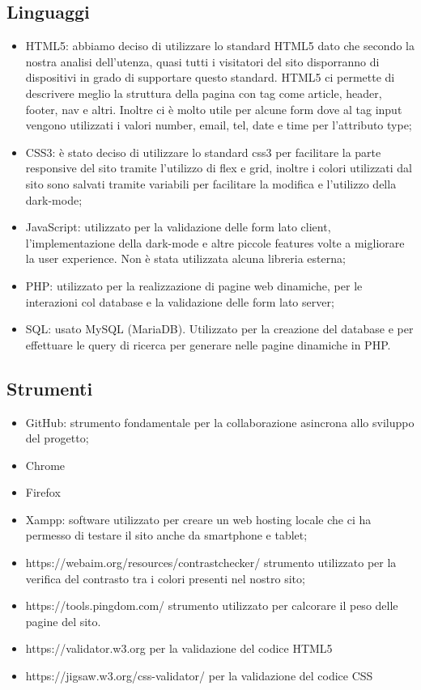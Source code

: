 \documentclass[a4paper]{article}
\begin{document}
    \subsection{Linguaggi}
    \begin{itemize}
        \item HTML5: abbiamo deciso di utilizzare lo standard HTML5 dato che secondo la nostra analisi dell’utenza, quasi tutti i visitatori del sito disporranno di dispositivi in grado di supportare questo standard. HTML5 ci permette di descrivere meglio la struttura della pagina con tag come article, header, footer, nav e altri. Inoltre ci è molto utile per alcune form dove al tag input vengono utilizzati i valori number, email, tel, date e time per l’attributo type;
        \item CSS3: è stato deciso di utilizzare lo standard css3 per facilitare la parte responsive del sito tramite l’utilizzo di flex e grid, inoltre i colori utilizzati dal sito sono salvati tramite variabili per facilitare la modifica e l’utilizzo della dark-mode;
        \item JavaScript: utilizzato per la validazione delle form lato client, l’implementazione della dark-mode e altre piccole features volte a migliorare la user experience. Non è stata utilizzata alcuna libreria esterna;
        \item PHP: utilizzato per la realizzazione di pagine web dinamiche, per le interazioni col database e la validazione delle form lato server;
        \item SQL: usato MySQL (MariaDB). Utilizzato per la creazione del database e per effettuare le query di ricerca per generare nelle pagine dinamiche in PHP.
    \end{itemize}

    \subsection{Strumenti}
    \begin{itemize}
        \item GitHub: strumento fondamentale per la collaborazione asincrona allo sviluppo del progetto;
        \item Chrome
        \item Firefox
        \item Xampp: software utilizzato per creare un web hosting locale che ci ha permesso di testare il sito anche da smartphone e tablet;
        \item https://webaim.org/resources/contrastchecker/ strumento utilizzato per la verifica del contrasto tra i colori presenti nel nostro sito;
        \item https://tools.pingdom.com/ strumento utilizzato per calcorare il peso delle pagine del sito.
        \item https://validator.w3.org per la validazione del codice HTML5
        \item https://jigsaw.w3.org/css-validator/ per la validazione del codice CSS
    \end{itemize}
\end{document}
